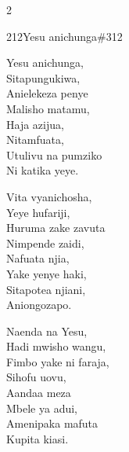 \documentclass{article}
\begin{document}
\begin{multicols}{2}
\begin{hymn}{212}{Yesu anichunga}{\#312}
\begin{stanza}
Yesu anichunga,\\
Sitapungukiwa,\\
Anielekeza penye\\
Malisho matamu,\\
Haja azijua,\\
Nitamfuata,\\
Utulivu na pumziko\\
Ni katika yeye.
\end{stanza}
\begin{stanza}
Vita vyanichosha,\\
Yeye hufariji,\\
Huruma zake zavuta\\
Nimpende zaidi,\\
Nafuata njia,\\
Yake yenye haki,\\
Sitapotea njiani,\\
Aniongozapo.
\end{stanza}
\begin{stanza}
Naenda na Yesu,\\
Hadi mwisho wangu,\\
Fimbo yake ni faraja,\\
Sihofu uovu,\\
Aandaa meza\\
Mbele ya adui,\\
Amenipaka mafuta\\
Kupita kiasi.
\end{stanza}
\end{hymn}


\end{multicols}
\end{document}

